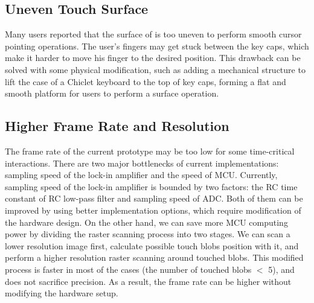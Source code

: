 \subsection{Uneven Touch Surface}
Many users reported that the surface of \papertitle\hspace{2pt} is too uneven to perform smooth cursor pointing operations.
The user's fingers may get stuck between the key caps, which make it harder to move his finger to the desired position.
This drawback can be solved with some physical modification, such as adding a mechanical structure to lift the case of a Chiclet keyboard to the top of key caps, forming a flat and smooth platform for users to perform a surface operation. 

\subsection{Higher Frame Rate and Resolution}
The frame rate of the current prototype may be too low for some time-critical interactions.
There are two major bottlenecks of current implementations: sampling speed of the lock-in amplifier and the speed of MCU.
Currently, sampling speed of the lock-in amplifier is bounded by two factors: the RC time constant of RC low-pass filter and sampling speed of ADC.
Both of them can be improved by using better implementation options, which require modification of the hardware design.
On the other hand, we can save more MCU computing power by dividing the raster scanning process into two stages.
We can scan a lower resolution image first, calculate possible touch blobs position with it, and perform a higher resolution raster scanning around touched blobs.
This modified process is faster in most of the cases (the number of touched blobs $<$ 5), and does not sacrifice precision.
As a result, the frame rate can be higher without modifying the hardware setup.
